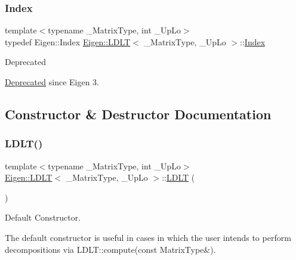 \subsubsection{\texorpdfstring{Index}{Index}}
{\footnotesize\ttfamily template$<$typename \+\_\+\+Matrix\+Type, int \+\_\+\+Up\+Lo$>$ \\
typedef Eigen\+::\+Index \mbox{\hyperlink{class_eigen_1_1_l_d_l_t}{Eigen\+::\+L\+D\+LT}}$<$ \+\_\+\+Matrix\+Type, \+\_\+\+Up\+Lo $>$\+::\mbox{\hyperlink{class_eigen_1_1_l_d_l_t_ad9c57eb2fb3bbccd51b9d2e111bea355}{Index}}}

\begin{DoxyRefDesc}{Deprecated}
\item[\mbox{\hyperlink{deprecated__deprecated000001}{Deprecated}}]since Eigen 3. \end{DoxyRefDesc}


\subsection{Constructor \& Destructor Documentation}
\mbox{\label{class_eigen_1_1_l_d_l_t_a2e06dedd2651649c5b251fbf9ba4e7d4}} 
\subsubsection{\texorpdfstring{LDLT()}{LDLT()}\hspace{0.1cm}{\footnotesize\ttfamily [1/4]}}
{\footnotesize\ttfamily template$<$typename \+\_\+\+Matrix\+Type, int \+\_\+\+Up\+Lo$>$ \\
\mbox{\hyperlink{class_eigen_1_1_l_d_l_t}{Eigen\+::\+L\+D\+LT}}$<$ \+\_\+\+Matrix\+Type, \+\_\+\+Up\+Lo $>$\+::\mbox{\hyperlink{class_eigen_1_1_l_d_l_t}{L\+D\+LT}} (\begin{DoxyParamCaption}{ }\end{DoxyParamCaption})\hspace{0.3cm}{\ttfamily [inline]}}



Default Constructor. 

The default constructor is useful in cases in which the user intends to perform decompositions via L\+D\+L\+T\+::compute(const Matrix\+Type\&). \mbox{\label{class_eigen_1_1_l_d_l_t_a154aa41bd2460199d48861eaf5e4f597}} 
